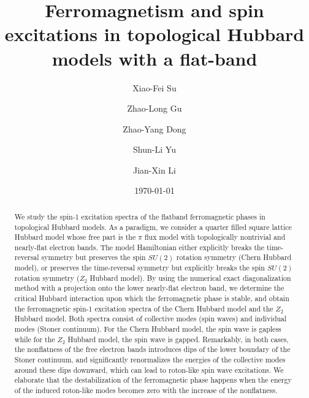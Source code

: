 \documentclass[amsmath,superscriptaddress,showpacs,aps,prb,twocolumn]{revtex4-1}
\begin{document}
\title{Ferromagnetism and spin excitations in topological Hubbard models with a flat-band}
\author{Xiao-Fei Su}
\author{Zhao-Long Gu}
\author{Zhao-Yang Dong}
\author{Shun-Li Yu}
\author{Jian-Xin Li}
\date{\today}

\begin{abstract}
\par We study the spin-1 excitation spectra of the flatband ferromagnetic phases in topological Hubbard models. As a paradigm, we consider a quarter filled square lattice Hubbard model whose free part is the $\pi$ flux model with topologically nontrivial and nearly-flat electron bands. The model Hamiltonian either explicitly breaks the time-reversal symmetry but preserves the spin $SU(2)$ rotation symmetry (Chern Hubbard model), or preserves the time-reversal symmetry but explicitly breaks the spin $SU(2)$ rotation symmetry ($Z_2$ Hubbard model). By using the numerical exact diagonalization method with a projection onto the lower nearly-flat electron band, we determine the critical Hubbard interaction upon which the ferromagnetic phase is stable, and obtain the ferromagnetic spin-1 excitation spectra of the Chern Hubbard model and the $Z_2$ Hubbard model. Both spectra consist of collective modes (spin waves) and individual modes (Stoner continuum). For the Chern Hubbard model, the spin wave is gapless while for the $Z_2$ Hubbard model, the spin wave is gapped. Remarkably, in both cases, the nonflatness of the free electron bands introduces dips of the lower boundary of the Stoner continuum, and significantly renormalizes the energies of the collective modes around these dips downward, which can lead to roton-like spin wave excitations. We elaborate that the destabilization of the ferromagnetic phase happens when the energy of the induced roton-like modes becomes zero with the increase of the nonflatness.
\end{abstract}
\maketitle
\end{document}

